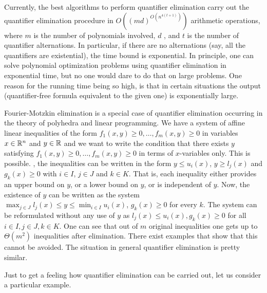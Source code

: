 \begin{remark}
	Currently, the best algorithms to perform quantifier elimination carry out the quantifier elimination procedure in $O((m d)^{O(n^{4 (t+1)})})$ arithmetic operations, where $m$ is the number of polynomials involved, $d$ , and $t$ is the number of quantifier alternations. In particular, if there are no alternations (say, all the quantifiers are existential), the time bound is exponential. In principle, one can solve polynomial optimization problems using quantifier elimination in exponential time,  but no one would dare to do that on large problems. One reason for the running time being so high, is that in certain situations the output (quantifier-free formula equivalent to the given one) is exponentially large. 
\end{remark}

\begin{remark}
	Fourier-Motzkin elimination is a special case of quantifier elimination occurring in the theory of polyhedra and linear programming. We have a system of affine linear inequalities of the form $f_1(x,y) \ge 0,\ldots,f_m(x,y) \ge 0$ in variables $x \in \mathbb{R}^n$ and $y \in \mathbb{R}$ and we want to write the condition that there exists  $y$ satisfying $f_1(x,y) \ge 0,\ldots, f_m(x,y) \ge 0$ in terms of $x$-variables only. This is possible. , the inequalities can be written in the form $y \le u_i(x)$, $y \ge l_j(x)$ and $g_k(x) \ge 0$ with $i \in I$, $j \in J$ and $k \in K$. That is, each inequality either provides an upper bound on $y$, or a lower bound on $y$, or is independent of $y$. Now, the existence of $y$ can be written as the system $\max_{j \in J} l_j(x) \le y \le \min_{i \in I} u_i(x)$, $g_k(x) \ge 0$ for every $k$. The system can be reformulated without any use of $y$ as $l_j(x) \le u_i(x), g_k(x) \ge 0$ for all $i \in I, j \in J, k \in K$. One can see that out of $m$ original inequalities one gets up to $\Theta(m^2)$ inequalities after elimination. There exist examples that show that this cannot be avoided. The situation in general quantifier elimination is pretty similar. 
\end{remark}

Just to get a feeling how quantifier elimination can be carried out, let us consider a particular example. 

